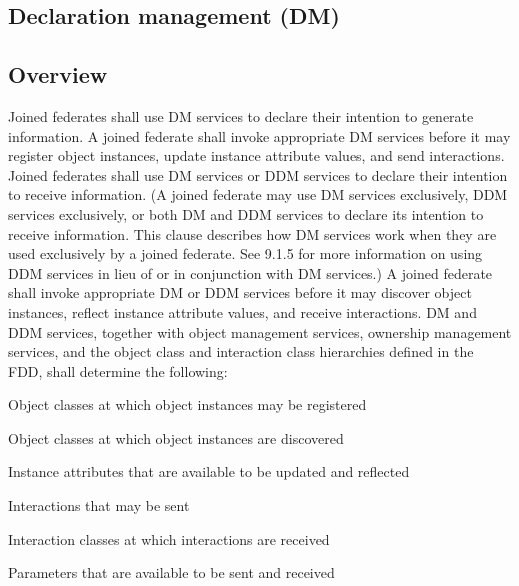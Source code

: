 
\begin{compactstdpage}
    \section{Declaration management (DM)}

    \subsection{Overview}

    Joined federates shall use DM services to declare their intention to generate information. A joined federate shall invoke appropriate DM services before it may register object instances, update instance attribute values, and send interactions. Joined federates shall use DM services or DDM services to declare their intention to receive information. (A joined federate may use DM services exclusively, DDM services exclusively, or both DM and DDM services to declare its intention to receive information. This clause describes how DM services work when they are used exclusively by a joined federate. See 9.1.5 for more information on using DDM services in lieu of or in conjunction with DM services.) A joined federate shall invoke appropriate DM or DDM services before it may discover object instances, reflect instance attribute values, and receive interactions. DM and DDM services, together with object management services, ownership management services, and the object class and interaction class hierarchies defined in the FDD, shall determine the following:

    \begin{stddashlist}
        \item Object classes at which object instances may be registered
        \item Object classes at which object instances are discovered
        \item Instance attributes that are available to be updated and reflected
        \item Interactions that may be sent
        \item Interaction classes at which interactions are received
        \item Parameters that are available to be sent and received
    \end{stddashlist}


\end{compactstdpage}
